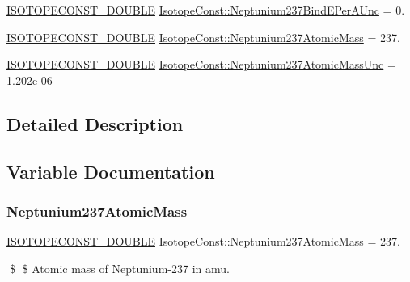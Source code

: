 \begin{DoxyCompactItemize}
\mbox{\hyperlink{group___isotope_const-_macros_ga8f45a7272ce02c0b4c65c44636ed719a}{I\+S\+O\+T\+O\+P\+E\+C\+O\+N\+S\+T\+\_\+\+D\+O\+U\+B\+LE}} \mbox{\hyperlink{group___isotope_const-_neptunium-_np237_ga7f0a543aaeb4be99b4aa97d4f34c1b6d}{Isotope\+Const\+::\+Neptunium237\+Bind\+E\+Per\+A\+Unc}} = 0.
\item 
\mbox{\hyperlink{group___isotope_const-_macros_ga8f45a7272ce02c0b4c65c44636ed719a}{I\+S\+O\+T\+O\+P\+E\+C\+O\+N\+S\+T\+\_\+\+D\+O\+U\+B\+LE}} \mbox{\hyperlink{group___isotope_const-_neptunium-_np237_ga9385ec27361f304fde564b01de3a5a8b}{Isotope\+Const\+::\+Neptunium237\+Atomic\+Mass}} = 237.
\item 
\mbox{\hyperlink{group___isotope_const-_macros_ga8f45a7272ce02c0b4c65c44636ed719a}{I\+S\+O\+T\+O\+P\+E\+C\+O\+N\+S\+T\+\_\+\+D\+O\+U\+B\+LE}} \mbox{\hyperlink{group___isotope_const-_neptunium-_np237_gaf8d4f65999119ad037e24c350bf82233}{Isotope\+Const\+::\+Neptunium237\+Atomic\+Mass\+Unc}} = 1.\+202e-\/06
\end{DoxyCompactItemize}


\subsection{Detailed Description}


\subsection{Variable Documentation}
\mbox{\label{group___isotope_const-_neptunium-_np237_ga9385ec27361f304fde564b01de3a5a8b}} 
\subsubsection{\texorpdfstring{Neptunium237\+Atomic\+Mass}{Neptunium237AtomicMass}}
{\footnotesize\ttfamily \mbox{\hyperlink{group___isotope_const-_macros_ga8f45a7272ce02c0b4c65c44636ed719a}{I\+S\+O\+T\+O\+P\+E\+C\+O\+N\+S\+T\+\_\+\+D\+O\+U\+B\+LE}} Isotope\+Const\+::\+Neptunium237\+Atomic\+Mass = 237.}

\$ \$ Atomic mass of Neptunium-\/237 in amu. \mbox{\label{group___isotope_const-_neptunium-_np237_gaf8d4f65999119ad037e24c350bf82233}} 
